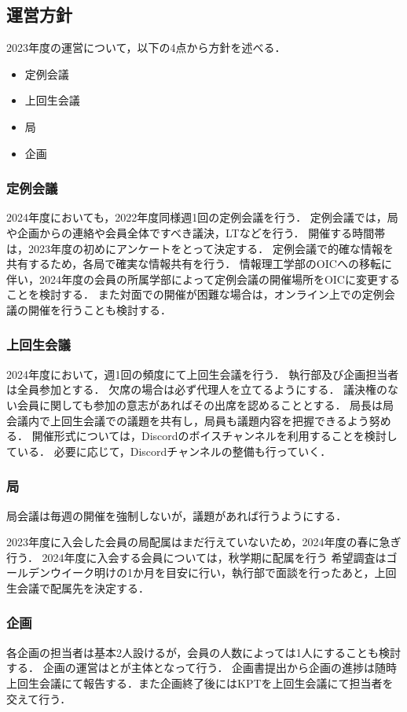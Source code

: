 \subsection*{運営方針}


2023年度の運営について，以下の4点から方針を述べる．
\begin{itemize}
    \item 定例会議
    \item 上回生会議
    \item 局
    \item 企画
\end{itemize}

\subsubsection*{定例会議}
2024年度においても，2022年度同様週1回の定例会議を行う．
定例会議では，局や企画からの連絡や会員全体ですべき議決，LTなどを行う．
開催する時間帯は，2023年度の初めにアンケートをとって決定する．
定例会議で的確な情報を共有するため，各局で確実な情報共有を行う．
情報理工学部のOICへの移転に伴い，2024年度の会員の所属学部によって定例会議の開催場所をOICに変更することを検討する．
また対面での開催が困難な場合は，オンライン上での定例会議の開催を行うことも検討する．

\subsubsection*{上回生会議}
2024年度において，週1回の頻度にて上回生会議を行う．
執行部及び企画担当者は全員参加とする．
欠席の場合は必ず代理人を立てるようにする．
議決権のない会員に関しても参加の意志があればその出席を認めることとする．
局長は局会議内で上回生会議での議題を共有し，局員も議題内容を把握できるよう努める．
開催形式については，Discordのボイスチャンネルを利用することを検討している．
必要に応じて，Discordチャンネルの整備も行っていく．

\subsubsection*{局}
局会議は毎週の開催を強制しないが，議題があれば行うようにする．

2023年度に入会した会員の局配属はまだ行えていないため，2024年度の春に急ぎ行う．
2024年度に入会する会員については，秋学期に配属を行う
希望調査はゴールデンウイーク明けの1か月を目安に行い，執行部で面談を行ったあと，上回生会議で配属先を決定する．

\subsubsection*{企画}
各企画の担当者は基本2人設けるが，会員の人数によっては1人にすることも検討する．
企画の運営は\newGradeIfKouki{}\secondGrade{}と\newGradeIfKouki{}\thirdGrade{}が主体となって行う．
企画書提出から企画の進捗は随時上回生会議にて報告する．また企画終了後にはKPTを上回生会議にて担当者を交えて行う．
